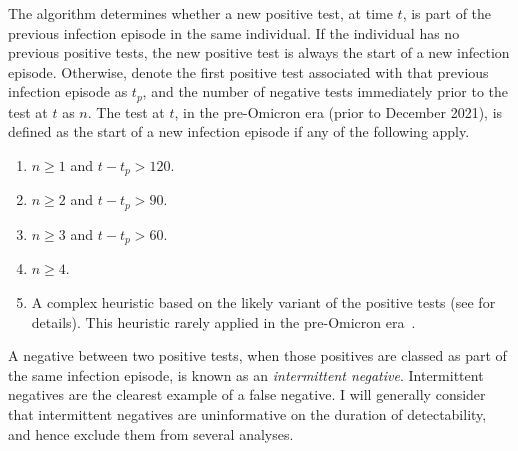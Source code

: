 \documentclass[thesis.tex]{subfiles}
\begin{document}
The algorithm determines whether a new positive test, at time $t$, is part of the previous infection episode in the same individual.
If the individual has no previous positive tests, the new positive test is always the start of a new infection episode.
Otherwise, denote the first positive test associated with that previous infection episode as $t_p$, and the number of negative tests immediately prior to the test at $t$ as $n$.
The test at $t$, in the pre-Omicron era (prior to December 2021), is defined as the start of a new infection episode if any of the following apply.
\begin{enumerate}
  \item $n \geq 1$ and $t - t_p > 120$.
  \item $n \geq 2$ and $t - t_p > 90$.
  \item $n \geq 3$ and $t - t_p > 60$.
  \item $n \geq 4$.
  \item A complex heuristic based on the likely variant of the positive tests (see \textcite{weiRisk} for details). This heuristic rarely applied in the pre-Omicron era~.
\end{enumerate}

A negative between two positive tests, when those positives are classed as part of the same infection episode, is known as an \emph{intermittent negative}.
Intermittent negatives are the clearest example of a false negative.
I will generally consider that intermittent negatives are uninformative on the duration of detectability, and hence exclude them from several analyses.
\end{document}
